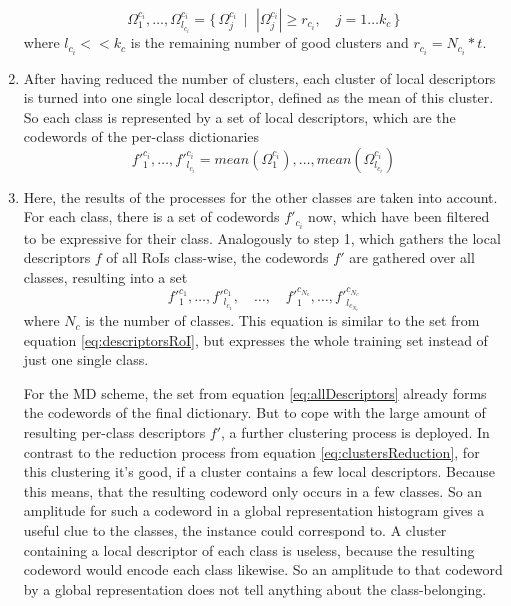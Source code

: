 \begin{enumerate}
	\begin{equation}\label{eq:clustersReduction}
	\Omega_1^{c_i},\dots,\Omega_{l_{c_i}}^{c_i} = \{\,\Omega_j^{c_i} \,\mid\,\, |\Omega_j^{c_i}| \ge r_{c_i},\quad j = 1\dots{k_c} \,\}
	\end{equation}
where $l_{c_i} << k_c$ is the remaining number of good clusters and $r_{c_i} = N_{c_i} * t$.
	\item After having reduced the number of clusters, each cluster of local descriptors is turned into one single local descriptor, defined as the mean of this cluster. So each class is represented by a set of local descriptors, which are the codewords of the per-class dictionaries
	\begin{equation}\label{eq:perClassCodewords}
	{f'}_1^{c_i},\dots,{f'}_{l_{c_i}}^{c_i} = mean(\Omega_1^{c_i}),\dots,mean(\Omega_{l_{c_i}}^{c_i})
	\end{equation}
	\item Here, the results of the processes for the other classes are taken into account. For each class, there is a set of codewords $f'_{c_i}$ now, which have been filtered to be expressive for their class. Analogously to step 1, which gathers the local descriptors $f$ of all RoIs class-wise, the codewords $f'$ are gathered over all classes, resulting into a set
	\begin{equation}\label{eq:allDescriptors}
	{f'}_1^{c_1},\dots,{f'}_{l_{c_1}}^{c_1},\quad\dots,\quad{f'}_1^{c_{N_c}},\dots,{f'}_{l_{c_{N_c}}}^{c_{N_c}}
	\end{equation}
where $N_c$ is the number of classes. This equation is similar to the set from equation \ref{eq:descriptorsRoI}, but expresses the whole training set instead of just one single class.

For the MD scheme, the set from equation \ref{eq:allDescriptors} already forms the codewords of the final dictionary. But to cope with the large amount of resulting per-class descriptors $f'$, a further clustering process is deployed. In contrast to the reduction process from equation \ref{eq:clustersReduction}, for this clustering it's good, if a cluster contains a few local descriptors. Because this means, that the resulting codeword only occurs in a few classes. So an amplitude for such a codeword in a global representation histogram gives a useful clue to the classes, the instance could correspond to. A cluster containing a local descriptor of each class is useless, because the resulting codeword would encode each class likewise. So an amplitude to that codeword by a global representation does not tell anything about the class-belonging.


\end{enumerate}
